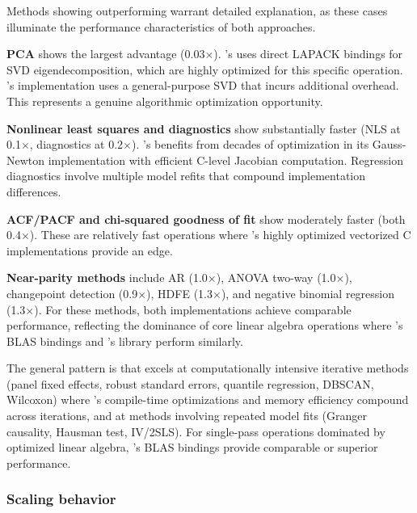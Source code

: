 

Methods showing  outperforming  warrant detailed
explanation, as these cases illuminate the performance characteristics of
both approaches.

\textbf{PCA} shows the largest  advantage (0.03$\times$).
's  uses direct LAPACK bindings for SVD
eigendecomposition, which are highly optimized for this specific operation.
's implementation uses a general-purpose SVD that
incurs additional overhead. This represents a genuine algorithmic
optimization opportunity.

\textbf{Nonlinear least squares and diagnostics} show 
substantially faster (NLS at 0.1$\times$, diagnostics at 0.2$\times$).
's  benefits from decades of optimization in its
Gauss-Newton implementation with efficient C-level Jacobian computation.
Regression diagnostics involve multiple model refits that compound
implementation differences.

\textbf{ACF/PACF and chi-squared goodness of fit} show 
moderately faster (both 0.4$\times$). These are relatively fast
operations where 's highly optimized vectorized C
implementations provide an edge.

\textbf{Near-parity methods} include AR (1.0$\times$), ANOVA two-way
(1.0$\times$), changepoint detection (0.9$\times$), HDFE (1.3$\times$),
and negative binomial regression (1.3$\times$). For these methods,
both implementations achieve comparable performance, reflecting the
dominance of core linear algebra operations where 's BLAS
bindings and 's  library perform similarly.

The general pattern is that  excels at computationally
intensive iterative methods (panel fixed effects, robust standard errors,
quantile regression, DBSCAN, Wilcoxon) where 's compile-time
optimizations and memory efficiency compound across iterations, and at
methods involving repeated model fits (Granger causality, Hausman test,
IV/2SLS). For single-pass operations dominated by optimized linear algebra,
's BLAS bindings provide comparable or superior performance.

\subsubsection{Scaling behavior}

